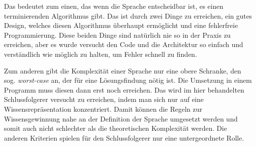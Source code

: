 Das bedeutet zum einen, das wenn die Sprache entscheidbar ist, es einen terminierenden Algorithmus gibt. Das ist durch zwei Dinge zu erreichen, ein gutes Design, welches diesen Algorithmus überhaupt ermöglicht und eine fehlerfreie Programmierung. Diese beiden Dinge sind natürlich nie so in der Praxis zu erreichen, aber es wurde versucht den Code und die Architektur so einfach und verständlich wie möglich zu halten, um Fehler schnell zu finden.

Zum anderen gibt die Komplexität einer Sprache nur eine obere Schranke, den sog. \emph{worst-case} an, der für eine Lösungsfindung nötig ist. Die Umsetzung in einem Programm muss diesen dann erst noch erreichen. Das wird im hier behandelten Schlussfolgerer versucht zu erreichen, indem man sich nur auf eine Wissensrepräsentation konzentriert. Damit können die Regeln zur Wissensgewinnung nahe an der Definition der Sprache umgesetzt werden und somit auch nicht schlechter als die theoretischen Komplexität werden.
Die anderen Kriterien spielen für den Schlussfolgerer nur eine untergeordnete Rolle.



